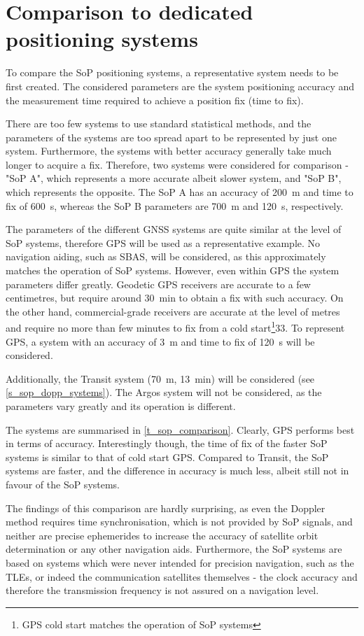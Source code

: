 \section{Comparison to dedicated positioning systems}
To compare the SoP positioning systems, a representative system needs to be first created. The considered parameters are the system positioning accuracy and the measurement time required to achieve a position fix (time to fix).

There are too few systems to use standard statistical methods, and the parameters of the systems are too spread apart to be represented by just one system. Furthermore, the systems with better accuracy generally take much longer to acquire a fix. Therefore, two systems were considered for comparison - "SoP A", which represents a more accurate albeit slower system, and "SoP B", which represents the opposite. The SoP A has an accuracy of \qty{200}{m} and time to fix of \qty{600}{s}, whereas the SoP B parameters are \qty{700}{m} and \qty{120}{s}, respectively.

The parameters of the different GNSS systems are quite similar at the level of SoP systems\cite{sop23}, therefore GPS will be used as a representative example. No navigation aiding, such as SBAS, will be considered, as this approximately matches the operation of SoP systems. However, even within GPS the system parameters differ greatly. Geodetic GPS receivers are accurate to a few centimetres, but require around \qty{30}{min} to obtain a fix with such accuracy\cite{sop23}. On the other hand, commercial-grade receivers are accurate at the level of metres and require no more than few minutes to fix from a cold start\footnote{GPS cold start matches the operation of SoP systems}\citep{pos04}{33}. To represent GPS, a system with an accuracy of \qty{3}{m} and time to fix of \qty{120}{s} will be considered.

Additionally, the Transit system (\qty{70}{m}, \qty{13}{min}) will be considered (see \autoref{s_sop_dopp_systems}). The Argos system will not be considered, as the parameters vary greatly and its operation is different.

The systems are summarised in \autoref{t_sop_comparison}. Clearly, GPS performs best in terms of accuracy. Interestingly though, the time of fix of the faster SoP systems is similar to that of cold start GPS. Compared to Transit, the SoP systems are faster, and the difference in accuracy is much less, albeit still not in favour of the SoP systems. 

The findings of this comparison are hardly surprising, as even the Doppler method requires time synchronisation, which is not provided by SoP signals, and neither are precise ephemerides to increase the accuracy of satellite orbit determination or any other navigation aids. Furthermore, the SoP systems are based on systems which were never intended for precision navigation, such as the TLEs, or indeed the communication satellites themselves - the clock accuracy and therefore the transmission frequency is not assured on a navigation level.

